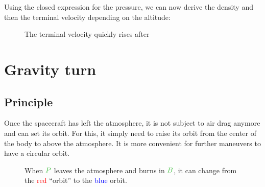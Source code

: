 Using the closed expression for the pressure, we can now derive the
density and then the terminal velocity depending on the altitude:

\begin{figure}[H]
	\centering
	\caption{The terminal velocity quickly rises after }
\end{figure}



\section{Gravity turn}


\subsection{Principle}

Once the spacecraft has left the atmosphere, it is not subject to air
drag anymore and can set its orbit. For this, it simply need to raise
its orbit from the center of the body to above the atmosphere. It is
more convenient for further maneuvers to have a circular orbit.

\begin{figure}[H]
	\centering
	\caption{
		When $\posit{P}$ leaves the atmosphere and burns in
		$\posit{B}$, it can change from the \textcolor{red}{red}
		“orbit” to the \textcolor{blue}{blue} orbit.
	}
\end{figure}


